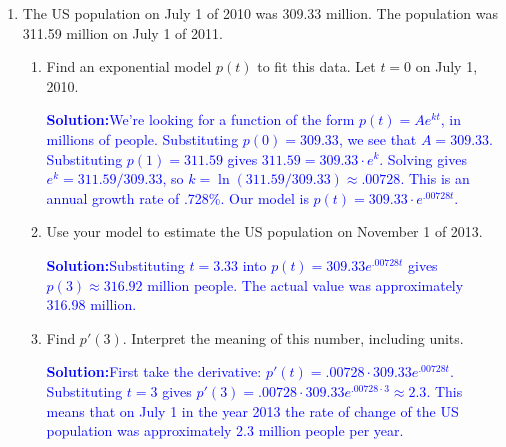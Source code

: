 \documentclass[letterpaper,11pt]{article}
\newcommand{\sol}[2]{\begin{minipage}[c][#1]{\linewidth}{\textcolor{blue}{\textbf{Solution:}}\quad \textcolor{blue}{#2}}\end{minipage}}
\newcommand{\sol}[2]{\begin{minipage}[c][#1]{\linewidth}{\vfill}\end{minipage}}
\begin{document}
\begin{enumerate}
\begin{multicols}{3}
\end{multicols}

\begin{enumerate}
\item Let $h(x)=g(f(x))$. Find $h'(3)$.

\sol{1 in}{$h'(3)=g'(f(3)) \cdot f'(3)=g'(1) \cdot f'(3)=2 \cdot 6=12$}

\item Let $k(x)=f(g(x))$.  Find $k'(1)$.

\sol{1in}{$k'(1)=f'(g(1)) \cdot g'(1)=f'(2) \cdot g'(1)=5 \cdot 2=10$.}

\end{enumerate}
\item The US population on July 1 of 2010 was 309.33 million.  The population was 311.59 million on July 1 of 2011.
\begin{enumerate}
\item  Find an exponential model $p(t)$ to fit this data.  Let $t=0$ on July 1, 2010.

\sol{1 in}{We're looking for a function of the form $p(t)=Ae^{kt}$, in millions of people.  Substituting $p(0)=309.33$, we see that $A = 309.33$.  Substituting $p(1) = 311.59$ gives $311.59 = 309.33\cdot e^{k}$.  Solving gives $e^k = 311.59/309.33$, so $k = \ln{(311.59/309.33)} \approx .00728$.  This is an annual growth rate of .728\%.  Our model is $p(t)=309.33\cdot e^{.00728t}$.}

\item  Use your model to estimate the US population on November 1 of 2013.

\sol{.5in}{Substituting $t=3.33$ into $p(t)=309.33e^{.00728t}$ gives $p(3)\approx 316.92$ million people.  The actual value was approximately 316.98 million.}

\item Find $p'(3)$.  Interpret the meaning of this number, including units.

\sol{1 in}{First take the derivative: $p'(t) = .00728\cdot 309.33 e^{.00728t}$.  Substituting $t=3$ gives $p'(3)=.00728\cdot 309.33 e^{.00728\cdot 3} \approx 2.3$.  This means that on July 1 in the year 2013 the rate of change of the US population was approximately 2.3 million people per year.}
\end{enumerate}
\newpage




\end{enumerate}
\end{document}
